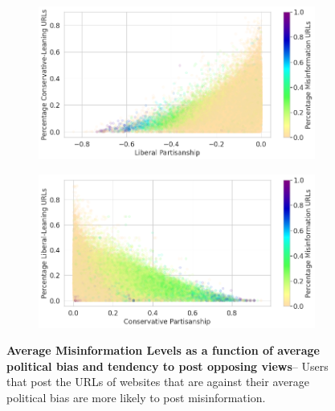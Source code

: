 \begin{figure}
\begin{subfigure}{.48\textwidth}
  \centering
  \includegraphics[width=1\linewidth]{figures/liberal-graph-partisan-misinformation.png}
\label{fig:left-twitter-pol-toxicity}
\end{subfigure}%
\begin{subfigure}{.48\textwidth}
  \centering
  \includegraphics[width=1\linewidth]{figures/conservative-graph-partisan-misinformation.png}
  \label{fig:right-twitter-pol-toxicity}
\end{subfigure}
\caption{\textbf{Average Misinformation Levels as a function of average political bias and tendency to post opposing views}-- Users that post the URLs of websites that are against their average political bias are more likely to post misinformation.
}
\label{fig:twitter-pol-toxicity}
\end{figure}

